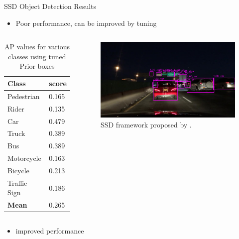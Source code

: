 \documentclass[10pt, aspectratio=169]{beamer}
\begin{document}
\begin{frame}[allowframebreaks]{SSD Object Detection Results}
    \begin{itemize}
        \item Poor performance, can be improved by tuning
    \end{itemize}

    \begin{columns}
            \begin{table}
                \caption{AP values for various classes using tuned Prior boxes}
                \begin{tabular}{ll}
                    \hline
                        \textbf{Class} & \textbf{score} \\ \hline
                        Pedestrian     & 0.165              \\ \hline
                        Rider          & 0.135              \\ \hline
                        Car            & 0.479              \\ \hline
                        Truck          & 0.389              \\ \hline
                        Bus            & 0.389               \\ \hline 
                        Motorcycle     & 0.163              \\ \hline
                        Bicycle        & 0.213              \\ \hline
                        Traffic Sign   & 0.186              \\ \hline
                        \textbf{Mean}  & 0.265  \\\hline
                \end{tabular}
            \end{table}
            \begin{figure}[!ht]
                \centering
                \includegraphics[scale=0.175]{images/tuned_9.png}
                \caption[SSD framework]{SSD framework proposed by \citet[p. 24]{Liu2016SSDSS}.}
            \end{figure}
    \end{columns}
    \begin{itemize}
        \item improved performance
    \end{itemize}
\end{frame}
\end{document}
